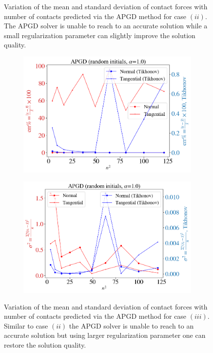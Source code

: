 \begin{itemize}
\begin{figure}[H]
\begin{subfigure}{0.48\columnwidth}
		\end{subfigure}
		\caption{Variation of the mean and standard deviation of contact forces with number of contacts predicted via the APGD method for case $(ii)$. The APGD solver is unable to reach to an accurate solution while a small regularization parameter can slightly improve the solution quality.}\label{fig:APGD_2}
	\end{figure}
	
	\begin{figure}[H]
		\centering	
		\begin{subfigure}{0.49\columnwidth}	
			\centering
			\includegraphics[width=1.0\textwidth]{images/CD/APGD_r_10_mean.png}
		\end{subfigure}
		\begin{subfigure}{0.49\columnwidth}	
			\centering
			\includegraphics[width=1.0\textwidth]{images/CD/APGD_r_10_std.png}
		\end{subfigure}
		\caption{Variation of the mean and standard deviation of contact forces with number of contacts predicted via the APGD method for case $(iii)$. Similar to case $(ii)$ the APGD solver is unable to reach to an accurate solution  but using larger regularization parameter one can restore the solution quality.}\label{fig:APGD_3}
	\end{figure}
\end{itemize}

